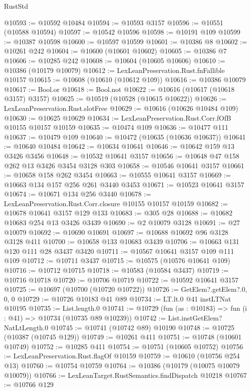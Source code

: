 \begin{lexlean}{RustStd}
\begin{coremodule}
@10593 := @10592 @10484
@10594 := @10593 @3157
@10596 := @10551 (@10588 @10594)
@10597 := @10542 @10596
@10598 := @10191 @109
@10599 := @10387 @10598
@10600 := @10597 @10599
@10601 := @10386 @8
@10602 := @10261 @242
@10604 := @10600 (@10601 @10602)
@10605 := @10386 @7
@10606 := @10285 @242
@10608 := @10604 (@10605 @10606)
@10610 := @10386 (@10179 @10079)
@10612 := LexLeanPreservation.Rust.fnFallible @10157
@10615 := @10608 (@10610 (@10612 @109))
@10616 := @10386 @10079
@10617 := Bool.or
@10618 := Bool.not
@10622 := @10616 (@10617 (@10618 @3157) @3157)
@10625 := @10519 (@10528 (@10615 @10622))
@10626 := LexLeanPreservation.Rust.slotFree
@10629 := @10616 (@10626 @10484 @109)
@10630 := @10625 @10629
@10634 := LexLeanPreservation.Rust.Corr.fOfB @10155 @10157 @10159
@10635 := @10474 @109
@10636 := @10477 @111
@10637 := @10479 @109
@10640 := @10472 (@10635 (@10636 @10637))
@10641 := @10640 @10484
@10642 := @10634 @10641
@10646 := @10642 @159 @13 @3426 @3456
@10648 := @10532 @10641 @3157
@10656 := @10648 @47 @158 @262 @13 @3426 @3454 @3128 @303
@10658 := @10546 @10641 @3157
@10661 := @10658 @158 @262 @3454
@10663 := @10555 @10641 @3157
@10669 := @10663 @134 @157 @256 @261 @3440 @3453
@10671 := @10523 @10641 @3157
@10674 := @10671 @134 @256 @3440
@10678 := LexLeanPreservation.Rust.Corr.closure @10155 @10157 @10159
@10682 := @10678 @10641 @3157 @129 @133
@10683 := @305 @28
@10688 := @10682 @10683 @254 @13 @3426 @3439
@10690 := @2 @10079 @3128
@10691 := @27 @10079
@10692 := @10690 @10691
@10697 := @10688 @10692 @96 @3128 @3128 @411
@10700 := @10658 @133 @10683 @3439
@10706 := @10663 @131 @120 @111 @28 @3437 @3420
@10711 := @10567 @10641 @3157 @109 @111 @109
@10712 := @10711 @3437
@10715 := @10575 (@10576 @10641 @109)
@10716 := @10712 @10715
@10718 := @10583 (@10584 @3437)
@10719 := @10716 @10718
@10720 := @10706 @10719
@10722 := @10592 @10641 @3157
@10725 := @10697 (@10700 (@10720 @10722))
@10726 := GetElem?.getElem?.{0, 0, 0}
@10729 := @10726 @10183 @41 @89
@10734 := LT.lt.{0} @41 instLTNat @10195
@10735 := List.length.{0}
@10741 := @10729 (fun (as : @10183) => fun (i : @41) => @10734 (@10735 @89 @10239))
@10742 := List.instGetElem?NatLtLength.{0}
@10745 := @10741 (@10742 @89) @10190
@10748 := @10725 (@10387 (@10745 @129))
@10749 := @10261 @411
@10751 := @10748 (@10601 @10749)
@10752 := @10285 @411
@10754 := @10751 (@10605 @10752)
@10756 := LexLeanPreservation.Rust.flagOf @10159
@10759 := @10610 (@10756 @254 @13)
@10760 := @10754 @10759
@10764 := @10386 (@10179 (@10075 @10079 @10079))
@10766 := LexLeanTarget.RustSemantics.findDispatch @10218
@10767 := @10766 @129

\end{coremodule}
\end{lexlean}
